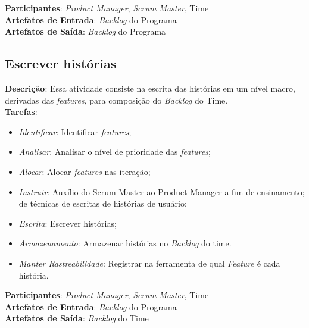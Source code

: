   \textbf{Participantes}: \textit{Product Manager}, \textit{Scrum Master}, Time\\

  \textbf{Artefatos de Entrada}: \textit{Backlog} do Programa \\

  \textbf{Artefatos de Saída}:  \textit{Backlog} do Programa \\

\subsection{Escrever histórias}
  \textbf{Descrição}: Essa atividade consiste na escrita das histórias em um nível macro, derivadas das \textit{features}, para composição do \textit{Backlog} do Time. \\

  \textbf{Tarefas}:
  \begin{itemize}
   \item \indent \textit{Identificar}: Identificar \textit{features};

   \item \indent \textit{Analisar}: Analisar o nível de prioridade das \textit{features};

   \item \indent \textit{Alocar}: Alocar \textit{features} nas iteração;

   \item \indent \textit{Instruir}: Auxílio do Scrum Master ao Product Manager a fim de ensinamento; de técnicas de escritas de histórias de usuário;

   \item \indent \textit{Escrita}: Escrever histórias;

   \item \indent \textit{Armazenamento}: Armazenar histórias no \textit{Backlog} do time.
   
   \item \indent \textit{Manter Rastreabilidade}: Registrar na ferramenta de qual \textit{Feature} é cada história.

  \end{itemize}

  \textbf{Participantes}: \textit{Product Manager}, \textit{Scrum Master}, Time\\

  \textbf{Artefatos de Entrada}: \textit{Backlog} do Programa \\

  \textbf{Artefatos de Saída}:   \textit{Backlog} do Time \\

